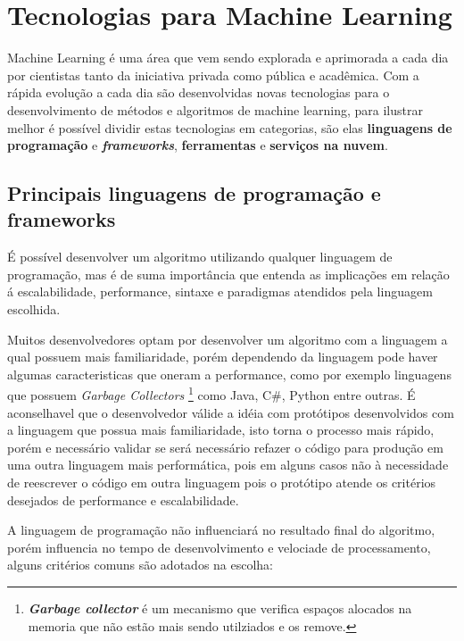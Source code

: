 \section{Tecnologias para Machine Learning}
\label{sec:tech-ml}

Machine Learning é uma área que vem sendo explorada e aprimorada a cada dia por cientistas tanto da iniciativa privada 
como pública e acadêmica. Com a rápida evolução a cada dia são desenvolvidas novas tecnologias para o desenvolvimento
de métodos e algoritmos de machine learning, para ilustrar melhor é possível  dividir estas tecnologias em categorias, são elas
\textbf{linguagens de programação} e \textbf{\textit{frameworks}}, \textbf{ferramentas} e \textbf{serviços na nuvem}. 

\subsection{Principais linguagens de programação e frameworks}
\label{subsec:ling-prog}

É possível desenvolver um algoritmo utilizando qualquer linguagem de programação, mas é de suma importância que entenda as implicações
em relação á escalabilidade, performance, sintaxe e paradigmas atendidos pela linguagem escolhida. 

Muitos desenvolvedores optam por desenvolver um algoritmo com a linguagem a qual possuem mais familiaridade, 
porém dependendo da linguagem pode haver algumas caracteristicas que  oneram a performance, como por exemplo linguagens que possuem 
\textit{Garbage Collectors} \footnote{\textbf{\textit{Garbage collector}} é um mecanismo que verifica espaços alocados na memoria que não estão mais sendo utilziados e os remove.} como Java, C\#, Python entre outras. É aconselhavel que o desenvolvedor válide a 
idéia com protótipos desenvolvidos com a linguagem que possua mais familiaridade, isto torna o processo mais rápido, porém e necessário
validar se será necessário refazer o código para produção em uma outra linguagem mais performática, pois em alguns casos não à necessidade
de reescrever o código em outra linguagem pois o protótipo atende os critérios desejados de performance e escalabilidade. 

A linguagem de programação não influenciará no resultado final do algoritmo, porém influencia no tempo de desenvolvimento e 
velociade de processamento, alguns critérios comuns são adotados na escolha:

